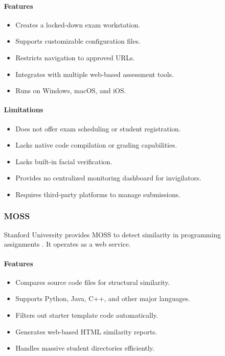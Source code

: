 \paragraph{Features}
\begin{itemize}[noitemsep]
\item Creates a locked-down exam workstation.
\item Supports customizable configuration files.
\item Restricts navigation to approved URLs.
\item Integrates with multiple web-based assessment tools.
\item Runs on Windows, macOS, and iOS.
\end{itemize}

\paragraph{Limitations}
\begin{itemize}[noitemsep]
\item Does not offer exam scheduling or student registration.
\item Lacks native code compilation or grading capabilities.
\item Lacks built-in facial verification.
\item Provides no centralized monitoring dashboard for invigilators.
\item Requires third-party platforms to manage submissions.
\end{itemize}

\subsubsection{MOSS}
Stanford University provides MOSS to detect similarity in programming assignments \cite{moss1}. It operates as a web service.

\paragraph{Features}
\begin{itemize}[noitemsep]
\item Compares source code files for structural similarity.
\item Supports Python, Java, C++, and other major languages.
\item Filters out starter template code automatically.
\item Generates web-based HTML similarity reports.
\item Handles massive student directories efficiently.
\end{itemize}

